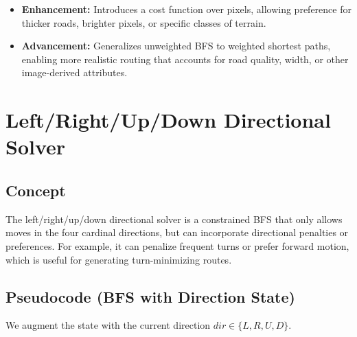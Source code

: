 \documentclass[11pt]{article}
\begin{document}
\begin{itemize}
  \item \textbf{Enhancement:} Introduces a cost function over pixels,
  allowing preference for thicker roads, brighter pixels, or specific
  classes of terrain.
  \item \textbf{Advancement:} Generalizes unweighted BFS to weighted
  shortest paths, enabling more realistic routing that accounts for
  road quality, width, or other image-derived attributes.
\end{itemize}
\clearpage
\section{Left/Right/Up/Down Directional Solver}
\label{sec:lrud_solver}

\subsection{Concept}

The left/right/up/down directional solver is a constrained BFS that
only allows moves in the four cardinal directions, but can incorporate
directional penalties or preferences. For example, it can penalize
frequent turns or prefer forward motion, which is useful for generating
turn-minimizing routes.

\subsection{Pseudocode (BFS with Direction State)}

We augment the state with the current direction $dir \in \{L,R,U,D\}$.
\end{document}
